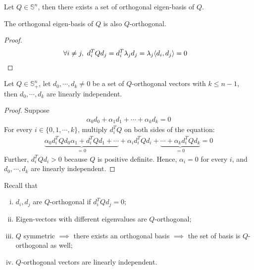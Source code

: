 \documentclass{article}
\begin{document}
	\begin{proposition}
		Let $Q \in \mathbb{S}^n$, then there exists a set of orthogonal eigen-basis of $Q$.
	\end{proposition}
	
	\begin{corollary}
		The orthogonal eigen-basis of $Q$ is also $Q$-orthogonal.
	\end{corollary}
	
	\begin{proof}
		\begin{align}
			\forall i \neq j,\ d_i^T Q d_j &= d_i^T \lambda_j d_j = \lambda_j \langle {d_i}, {d_j} \rangle = 0
		\end{align}
	\end{proof}
	
	\begin{proposition}
		Let $Q \in \mathbb{S}_+^n$, let $d_0, \cdots, d_k \neq 0$ be a set of $Q$-orthogonal vectors with $k \leq n - 1$, then $d_0, \cdots, d_k$ are linearly independent.
	\end{proposition}
	
	\begin{proof}
		Suppose
		\begin{align}
			\alpha_0 d_0 + \alpha_1 d_1 + \cdots + \alpha_k d_k = 0
		\end{align}
		 For every $i \in \{0, 1, \cdots, k\}$, multiply $d_i^T Q$ on both sides of the equation:
		 \begin{align}
		 	\underbrace{\alpha_0 d_i^T Q d_0
		 	\alpha_1 + d_i^T Q d_1 
		 	+ \cdots}_{=0}
		 	+ \alpha_i d_i^T Q d_i
		 	+ \underbrace{\cdots 
		 	+\alpha_k d_i^T Q d_k}_{=0} = 0
		 \end{align}
		 Further, $d_i^T Q d_i > 0$ because $Q$ is positive definite. Hence, $\alpha_i = 0$ for every $i$, and $d_0, \cdots, d_k$ are linearly independent.
	\end{proof}
	
	\begin{lemma}
		Recall that 
		\begin{enumerate}[(i)]
			\item $d_i, d_j$ are $Q$-orthogonal if $d_i^T Q d_j = 0$;
			\item Eigen-vectors with different eigenvalues are $Q$-orthogonal;
			\item $Q$ symmetric $\implies$ there exists an orthogonal basis $\implies$ the set of basis is $Q$-orthogonal as well;
			\item $Q$-orthogonal vectors are linearly independent.
		\end{enumerate}
	\end{lemma}
	
\end{document}
